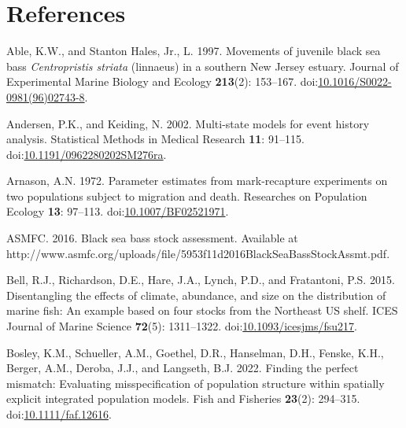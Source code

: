 \documentclass[
]{article}
\newlength{\cslhangindent}
\newlength{\cslentryspacingunit} %
\newenvironment{CSLReferences}[2] %
 {%
  \setlength{\parindent}{0pt}
  \ifodd #1
  \let\oldpar\par
  \def\par{\hangindent=\cslhangindent\oldpar}
  \fi
  \setlength{\parskip}{#2\cslentryspacingunit}
 }%
 {}
\begin{document}
\hypertarget{references}{%
\section*{References}\label{references}}

\hypertarget{refs}{}
\begin{CSLReferences}{1}{0}
\leavevmode{}%
Able, K.W., and Stanton Hales, Jr., L. 1997. Movements of juvenile black sea bass \emph{{C}entropristis striata} (linnaeus) in a southern {N}ew {J}ersey estuary. Journal of Experimental Marine Biology and Ecology \textbf{213}(2): 153--167. doi:\href{https://doi.org/10.1016/S0022-0981(96)02743-8}{10.1016/S0022-0981(96)02743-8}.

\leavevmode{}%
Andersen, P.K., and Keiding, N. 2002. Multi-state models for event history analysis. Statistical Methods in Medical Research \textbf{11}: 91--115. doi:\href{https://doi.org/10.1191/0962280202SM276ra}{10.1191/0962280202SM276ra}.

\leavevmode{}%
Arnason, A.N. 1972. Parameter estimates from mark-recapture experiments on two populations subject to migration and death. Researches on Population Ecology \textbf{13}: 97--113. doi:\href{https://doi.org/10.1007/BF02521971}{10.1007/BF02521971}.

\leavevmode{}%
ASMFC. 2016. Black sea bass stock assessment. {Available} at http://www.asmfc.org/uploads/file/5953f11d2016BlackSeaBassStockAssmt.pdf.

\leavevmode{}%
Bell, R.J., Richardson, D.E., Hare, J.A., Lynch, P.D., and Fratantoni, P.S. 2015. Disentangling the effects of climate, abundance, and size on the distribution of marine fish: An example based on four stocks from the {N}ortheast {US} shelf. ICES Journal of Marine Science \textbf{72}(5): 1311--1322. doi:\href{https://doi.org/10.1093/icesjms/fsu217}{10.1093/icesjms/fsu217}.

\leavevmode{}%
Bosley, K.M., Schueller, A.M., Goethel, D.R., Hanselman, D.H., Fenske, K.H., Berger, A.M., Deroba, J.J., and Langseth, B.J. 2022. Finding the perfect mismatch: Evaluating misspecification of population structure within spatially explicit integrated population models. Fish and Fisheries \textbf{23}(2): 294--315. doi:\href{https://doi.org/10.1111/faf.12616}{10.1111/faf.12616}.


\end{CSLReferences}
\end{document}
